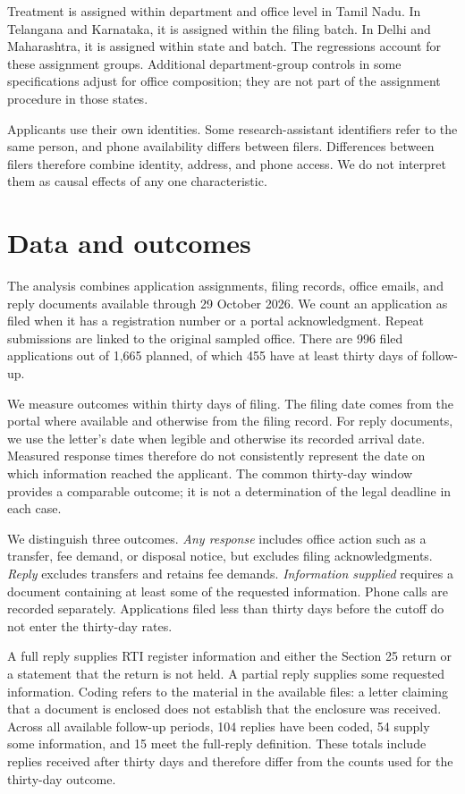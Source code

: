 \documentclass[11pt]{article}
\begin{document}
Treatment is assigned within department and office level in Tamil Nadu. In Telangana and Karnataka, it is assigned within the filing batch. In Delhi and Maharashtra, it is assigned within state and batch. The regressions account for these assignment groups. Additional department-group controls in some specifications adjust for office composition; they are not part of the assignment procedure in those states.

Applicants use their own identities. Some research-assistant identifiers refer to the same person, and phone availability differs between filers. Differences between filers therefore combine identity, address, and phone access. We do not interpret them as causal effects of any one characteristic.

\section{Data and outcomes}
The analysis combines application assignments, filing records, office emails, and reply documents available through 29 October 2026. We count an application as filed when it has a registration number or a portal acknowledgment. Repeat submissions are linked to the original sampled office. There are 996 filed applications out of 1,665 planned, of which 455 have at least thirty days of follow-up.

We measure outcomes within thirty days of filing. The filing date comes from the portal where available and otherwise from the filing record. For reply documents, we use the letter's date when legible and otherwise its recorded arrival date. Measured response times therefore do not consistently represent the date on which information reached the applicant. The common thirty-day window provides a comparable outcome; it is not a determination of the legal deadline in each case.

We distinguish three outcomes. \emph{Any response} includes office action such as a transfer, fee demand, or disposal notice, but excludes filing acknowledgments. \emph{Reply} excludes transfers and retains fee demands. \emph{Information supplied} requires a document containing at least some of the requested information. Phone calls are recorded separately. Applications filed less than thirty days before the cutoff do not enter the thirty-day rates.

A full reply supplies RTI register information and either the Section 25 return or a statement that the return is not held. A partial reply supplies some requested information. Coding refers to the material in the available files: a letter claiming that a document is enclosed does not establish that the enclosure was received. Across all available follow-up periods, 104 replies have been coded, 54 supply some information, and 15 meet the full-reply definition. These totals include replies received after thirty days and therefore differ from the counts used for the thirty-day outcome.
\end{document}
